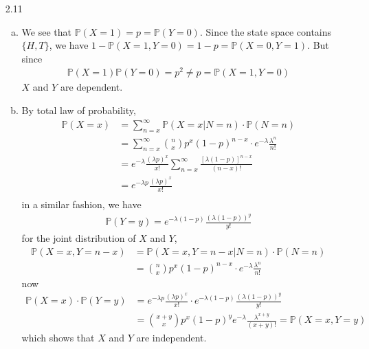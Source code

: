 \documentclass[a4paper,10pt]{article}
\theoremstyle{definition}
\begin{document}
\begin{enumerate}
\begin{enumerate}[(a)]
\end{enumerate}
\item[2.11]
\begin{enumerate}[(a)]
\item We see that $\mathbb{P}(X = 1) = p = \mathbb{P}(Y=0)$. Since the state space contains  $\{H,T\}$, we have $1 - \mathbb{P}(X =1,Y=0) = 1- p = \mathbb{P}(X = 0, Y = 1)$. But since
\begin{align*}
\mathbb{P}(X = 1)\mathbb{P}(Y=0) = p^2 \neq p = \mathbb{P}(X = 1, Y =0)
\end{align*}
$X$ and $Y$ are dependent.
\item By total law of probability, 
\begin{align*}
\mathbb{P}(X=x) &= \sum_{n = x}^{\infty} \mathbb{P}(X=x|N=n)\cdot \mathbb{P}(N=n)\\
&= \sum_{n = x}^{\infty} \binom{n}{x}p^x(1-p)^{n-x}
\cdot e^{-\lambda}\frac{\lambda^n}{n!}\\
&= e^{-\lambda}\frac{(\lambda p)^x}{x!}\sum_{n = x}^{\infty} \frac{[\lambda(1-p)]^{n-x}}{(n-x)!}\\
&= e^{-\lambda p}\frac{(\lambda p)^x}{x!}\\
\end{align*}
in a similar fashion, we have
\begin{align*}
\mathbb{P}(Y=y) = e^{-\lambda (1-p)}\frac{(\lambda (1-p))^y}{y!}
\end{align*}
for the joint distribution of $X$ and $Y$, 
\begin{align*}
\mathbb{P}(X=x, Y=n-x) &= \mathbb{P}(X=x, Y=n-x| N=n)\cdot \mathbb{P}(N=n)\\
&=\binom{n}{x}p^x(1-p)^{n-x}\cdot e^{-\lambda}\frac{\lambda^n}{n!}
\end{align*}
now
\begin{align*}
\mathbb{P}(X=x)\cdot\mathbb{P}(Y=y) &= e^{-\lambda p}\frac{(\lambda p)^x}{x!} \cdot e^{-\lambda (1-p)}\frac{(\lambda (1-p))^y}{y!}\\
&=\binom{x+y}{x} p^x(1-p)^y e^{-\lambda}\frac{\lambda^{x+y}}{(x+y)!} = \mathbb{P}(X=x, Y=y)
\end{align*}
which shows that $X$ and $Y$ are independent.
\end{enumerate}


\end{enumerate}
\end{document}
